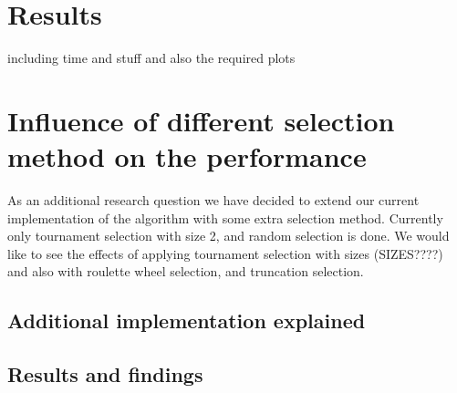 \documentclass[10pt,a4paper,onecolumn]{article}
\begin{document}
\section{Results} \label{sec:results}
including time and stuff
and also the required plots

\section{Influence of different selection method on the performance}
\label{sec:research}
As an additional research question we have decided to extend our current implementation of the algorithm with some extra selection method. Currently only tournament selection with size 2, and random selection is done. We would like to see the effects of applying tournament selection with sizes (SIZES????) and also with roulette wheel selection, and truncation selection.

\subsection{Additional implementation explained}

\subsection{Results and findings}
\end{document}
